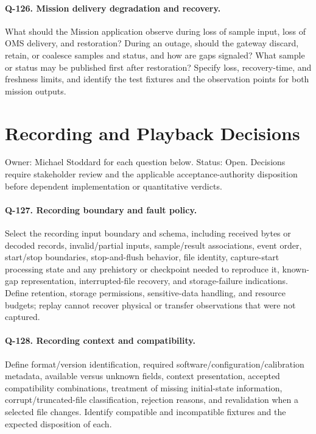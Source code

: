 \paragraph{Q-126. Mission delivery degradation and recovery.}\label{Question:Q-126}
What should the Mission application observe during loss of sample input,
loss of OMS delivery, and restoration? During an outage, should the gateway
discard, retain, or coalesce samples and status, and how are gaps signaled?
What sample or status may be published first after restoration? Specify
loss, recovery-time, and freshness limits, and identify the test fixtures
and the observation points for both mission outputs.

\section{Recording and Playback Decisions}
\label{Section:RecordingPlaybackDecisions}
Owner: Michael Stoddard for each question below. Status: Open. Decisions require stakeholder review and the applicable acceptance-authority disposition before dependent implementation or quantitative verdicts.

\paragraph{Q-127. Recording boundary and fault policy.}\label{Question:Q-127}
Select the recording input boundary and schema, including received bytes or decoded records, invalid/partial inputs, sample/result associations, event order, start/stop boundaries, stop-and-flush behavior, file identity, capture-start processing state and any prehistory or checkpoint needed to reproduce it, known-gap representation, interrupted-file recovery, and storage-failure indications. Define retention, storage permissions, sensitive-data handling, and resource budgets; replay cannot recover physical or transfer observations that were not captured.

\paragraph{Q-128. Recording context and compatibility.}\label{Question:Q-128}
Define format/version identification, required software/configuration/calibration metadata, available versus unknown fields, context presentation, accepted compatibility combinations, treatment of missing initial-state information, corrupt/truncated-file classification, rejection reasons, and revalidation when a selected file changes. Identify compatible and incompatible fixtures and the expected disposition of each.

